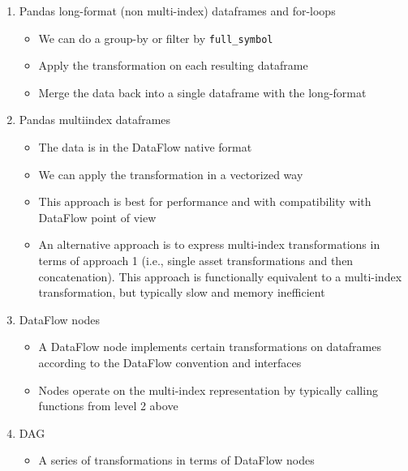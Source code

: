 \documentclass[11pt, reqno]{amsart}
\theoremstyle{definition}
\theoremstyle{remark}
\begin{document}
  \begin{enumerate}
    \item Pandas long-format (non multi-index) dataframes and for-loops
      \begin{itemize}
        \item We can do a group-by or filter by \verb|full_symbol|

        \item Apply the transformation on each resulting dataframe

        \item Merge the data back into a single dataframe with the long-format
      \end{itemize}

    \item Pandas multiindex dataframes
      \begin{itemize}
        \item The data is in the DataFlow native format

        \item We can apply the transformation in a vectorized way

        \item This approach is best for performance and with compatibility with DataFlow
          point of view

        \item An alternative approach is to express multi-index transformations in
          terms of approach 1 (i.e., single asset transformations and then
          concatenation). This approach is functionally equivalent to a multi-index
          transformation, but typically slow and memory inefficient
      \end{itemize}

    \item DataFlow nodes
      \begin{itemize}
        \item A DataFlow node implements certain transformations on dataframes according
          to the DataFlow convention and interfaces

        \item Nodes operate on the multi-index representation by typically calling
          functions from level 2 above
      \end{itemize}

    \item DAG
      \begin{itemize}
        \item A series of transformations in terms of DataFlow nodes
      \end{itemize}
  \end{enumerate}
\end{document}
